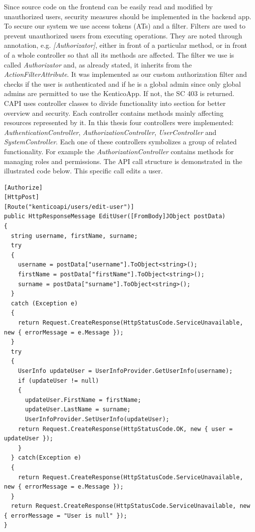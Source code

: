 Since source code on the frontend can be easily read and modified by unauthorized users, security measures should be implemented in the backend app. To secure our system we use access tokens (ATs) and a filter. Filters are used to prevent unauthorized users from executing operations. They are noted through annotation, e.g. \textit{[Authorizator]}, either in front of a particular method, or in front of a whole controller so that all its methods are affected. The filter we use is called \textit{Authorizator} and, as already stated, it inherits from the \textit{ActionFilterAttribute}. It was implemented as our custom authorization filter and checks if the user is authenticated and if he is a global admin since only global admins are permitted to use the KenticoApp. If not, the SC 403 is returned.
CAPI uses controller classes to divide functionality into section for better overview and security. Each controller contains methods mainly affecting resources represented by it. In this thesis four controllers were implemented: \textit{AuthenticationController}, \textit{AuthorizationController}, \textit{UserController} and \textit{SystemController}. Each one of these controllers symbolizes a group of related functionality. For example the \textit{AuthorizationController} contains methods for managing roles and permissions. 
The API call structure is demonstrated in the illustrated code below. This specific call edits a user.
\lstset{style=sharpc, numbers=left}
\begin{lstlisting}
[Authorize]
[HttpPost]
[Route("kenticoapi/users/edit-user")]
public HttpResponseMessage EditUser([FromBody]JObject postData)
{
  string username, firstName, surname;
  try
  {
    username = postData["username"].ToObject<string>();
    firstName = postData["firstName"].ToObject<string>(); 
    surname = postData["surname"].ToObject<string>();
  }
  catch (Exception e)
  {
    return Request.CreateResponse(HttpStatusCode.ServiceUnavailable, new { errorMessage = e.Message });
  }
  try
  {
    UserInfo updateUser = UserInfoProvider.GetUserInfo(username);
    if (updateUser != null)
    {
      updateUser.FirstName = firstName;
      updateUser.LastName = surname;
      UserInfoProvider.SetUserInfo(updateUser);
    return Request.CreateResponse(HttpStatusCode.OK, new { user = updateUser });
    }
  } catch(Exception e)
  {
    return Request.CreateResponse(HttpStatusCode.ServiceUnavailable, new { errorMessage = e.Message });
  }
  return Request.CreateResponse(HttpStatusCode.ServiceUnavailable, new { errorMessage = "User is null" });
}
\end{lstlisting}
